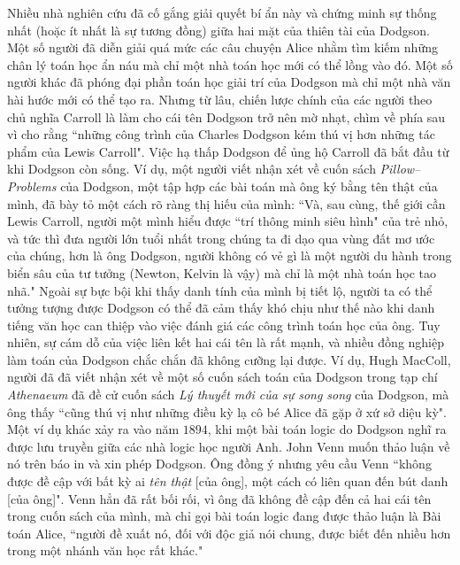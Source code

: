 \begin{multicols}{2}
	\vskip 0.1cm
	Nhiều nhà nghiên cứu đã cố gắng giải quyết bí ẩn này và chứng minh sự thống nhất (hoặc ít nhất là sự tương đồng) giữa hai mặt của  thiên tài của Dodgson. Một số người đã diễn giải quá mức các câu chuyện Alice nhằm tìm kiếm những chân lý toán học ẩn náu mà chỉ một nhà toán học mới có thể lồng vào đó. Một số người khác đã phóng đại phần toán học giải trí của Dodgson mà chỉ một nhà văn hài hước mới có thể tạo ra. Nhưng từ lâu, chiến lược chính của các người theo chủ nghĩa Carroll là làm cho cái tên Dodgson trở nên mờ nhạt, chìm về phía sau vì cho rằng ``những công trình của Charles Dodgson kém thú vị hơn những tác phẩm của Lewis Carroll".
	\vskip 0.1cm
	Việc hạ thấp Dodgson để ủng hộ Carroll đã bắt đầu từ khi Dodgson còn sống. Ví dụ, một người viết nhận xét về cuốn sách \textit{Pillow--Problems} của Dodgson, một tập hợp các bài toán mà ông ký bằng tên thật của mình, đã bày tỏ một cách rõ ràng thị hiếu của mình: 
	\vskip 0.1cm
	``Và, sau cùng, thế giới cần Lewis Carroll, người một mình hiểu được ``trí thông minh siêu hình" của trẻ nhỏ, và tức thì đưa người lớn tuổi nhất trong chúng ta đi dạo qua vùng đất mơ ước của chúng, hơn là ông Dodgson, người không có vẻ gì là một người du hành trong biển sâu của tư tưởng (Newton, Kelvin là vậy) mà chỉ là một nhà toán học tao nhã."
	\vskip 0.1cm
	Ngoài sự bực bội khi thấy danh tính của mình bị tiết lộ, người ta có thể tưởng tượng được Dodgson có thể đã cảm thấy khó chịu như thế nào khi danh tiếng văn học can thiệp vào việc đánh giá các công trình toán học của ông. Tuy nhiên, sự cám dỗ của việc liên kết hai cái tên là rất mạnh, và nhiều đồng nghiệp làm toán của Dodgson chắc chắn đã không cưỡng lại được. Ví dụ, Hugh MacColl, người đã đã viết nhận xét về một số cuốn sách toán của Dodgson trong tạp chí \textit{Athenaeum} đã đề cử cuốn sách \textit{Lý thuyết mới của sự song song} của Dodgson, mà ông thấy ``cũng thú vị như những điều kỳ lạ cô bé Alice đã gặp ở xứ sở diệu kỳ". Một ví dụ khác xảy ra vào năm $1894$, khi một bài toán  logic do Dodgson nghĩ ra được lưu truyền giữa các nhà logic học người Anh. John Venn muốn thảo luận về nó trên báo in và xin phép Dodgson. Ông đồng ý nhưng yêu cầu Venn ``không được đề cập với bất kỳ ai  \textit{tên thật} [của ông], một cách có liên quan đến bút danh [của ông]". Venn hẳn đã rất bối rối, vì ông đã không đề cập đến cả hai cái tên trong cuốn sách của mình, mà chỉ gọi bài toán logic đang được thảo luận là Bài toán Alice, ``người đề xuất nó, đối với độc giả nói chung, được biết đến nhiều hơn trong một nhánh văn học rất khác."
	\vskip 0.1cm

\end{multicols}
